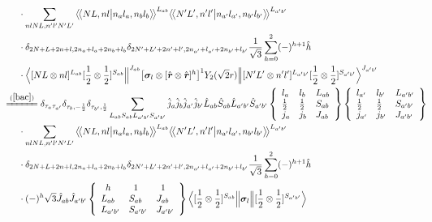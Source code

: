 \documentclass[master]{shnuthesis}
\newcommand{\llangle}{\big\langle\!\big\langle}
\newcommand{\rrangle}{\big\rangle\!\big\rangle}
\newcommand{\bmr}{\textbf{\textit{r}}}
\newcommand{\ap}{a^\prime}
\newcommand{\bp}{b^\prime}
\newcommand{\il}{\!\!\!\!\!\!\!\!\!\!}
\newcommand{\zdydh}{\xlongequal}
\begin{document}
\begin{align}
    & \cdot \sum_{nlNL,n^\prime l^\prime N^\prime L^\prime} \llangle N L, n l \big| n_{a} l_{a}, n_{b} l_{b} \rrangle^{L_{ab}} \llangle N^\prime L^\prime, n^\prime l^\prime \big| n_{a^\prime} l_{a^\prime}, n_{b^\prime} l_{b^\prime} \rrangle^{L_{\ap\bp}} \notag\\
    & \cdot \delta_{2N+L+2n+l,2n_a+l_a+2n_b+l_b}\delta_{2N^\prime+L^\prime+2n^\prime+l^\prime,2n_{a^\prime}+l_{a^\prime}+2n_{b^\prime}+l_{b^\prime}} \frac{1}{\sqrt{3}} \sum_{h=0}^{2} (-)^{h+1}\hat{h}  \notag\\
    & \cdot \Big\langle [N L \otimes n l]^{L_{ab}} [\frac{1}{2}\otimes\frac{1}{2}]^{S_{ab}} \Big\|^{J_{ab}} \big[ \bm{\sigma}_l \otimes [\hat{\bmr} \otimes \hat{\bmr}]^h \big]^1 Y_2(\sqrt{2}r) \Big\| [N^\prime L^\prime \otimes n^\prime l^\prime]^{L_{\ap\bp}} [\frac{1}{2}\otimes\frac{1}{2}]^{S_{\ap\bp}} \Big\rangle^{J_{\ap \bp}} \\
    &\il \zdydh{(\ref{bac})} \delta_{\tau_a \tau_{\ap}}\delta_{\tau_b, -\frac{1}{2}}\delta_{\tau_{\bp}, \frac{1}{2}} \sum_{L_{ab}S_{ab}L_{\ap\bp}S_{\ap\bp}} \hat{j}_a\hat{j}_b\hat{j}_{\ap}\hat{j}_{\bp}\hat{L}_{ab}\hat{S}_{ab}\hat{L}_{\ap\bp}\hat{S}_{\ap\bp}  \left\{\begin{array}{lll}l_{a} & l_{b} & L_{ab} \\ \frac{1}{2} & \frac{1}{2} & S_{ab} \\j_{a} & j_{b} & J_{ab} \end{array}\right\} \left\{\begin{array}{lll}l_{\ap} & l_{\bp} & L_{\ap\bp} \\ \frac{1}{2} & \frac{1}{2} & S_{\ap\bp} \\j_{\ap} & j_{\bp} & J_{\ap\bp} \end{array}\right\}  \notag \\
    & \cdot \sum_{nlNL,n^\prime l^\prime N^\prime L^\prime} \llangle N L, n l \big| n_{a} l_{a}, n_{b} l_{b} \rrangle^{L_{ab}} \llangle N^\prime L^\prime, n^\prime l^\prime \big| n_{a^\prime} l_{a^\prime}, n_{b^\prime} l_{b^\prime} \rrangle^{L_{\ap\bp}} \notag\\
    & \cdot \delta_{2N+L+2n+l,2n_a+l_a+2n_b+l_b}\delta_{2N^\prime+L^\prime+2n^\prime+l^\prime,2n_{a^\prime}+l_{a^\prime}+2n_{b^\prime}+l_{b^\prime}} \frac{1}{\sqrt{3}} \sum_{h=0}^{2} (-)^{h+1}\hat{h}  \notag\\
    & \cdot (-)^{h}\sqrt{3}\hat{J}_{ab}\hat{J}_{\ap\bp}  \left\{\begin{array}{lll} \,\,\,h & \,\,\,1 & \,\,\,1 \\ L_{ab} & S_{ab} & J_{ab} \\ L_{\ap\bp} & S_{\ap\bp} & J_{\ap\bp} \end{array}\right\}  \Big\langle [\frac{1}{2}\otimes\frac{1}{2}]^{S_{ab}} \Big\| \bm{\sigma}_l \Big\| [\frac{1}{2}\otimes\frac{1}{2}]^{S_{\ap\bp}} \Big\rangle  \notag\\

\end{align}
\end{document}
